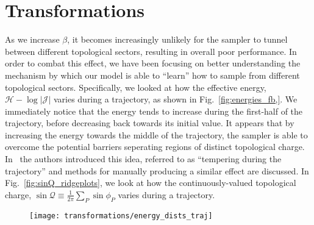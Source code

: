 %
\section{Transformations}
\label{sec:transformations}
%
As we increase \(\beta\), it becomes increasingly unlikely for the sampler to
tunnel between different topological sectors, resulting in overall poor
performance.
%
In order to combat this effect, we have been focusing on better understanding
the mechanism by which our model is able to ``learn'' how to sample from
different topological sectors.
%
Specifically, we looked at how the effective energy, \(\mathcal{H} -
\log|\mathcal{J}|\) varies during a trajectory, as shown in
Fig.~\ref{fig:energies_fb,}.
%
We immediately notice that the energy tends to increase during the first-half
of the trajectory, before decreasing back towards its initial value.
%
It appears that by increasing the energy towards the middle of the trajectory,
the sampler is able to overcome the potential barriers seperating regions of
distinct topological charge.
%
In~\cite{Neal_2012} the authors introduced this idea, referred to as
``tempering during the trajectory'' and methods for manually producing a
similar effect are discussed.
%
In Fig.~\ref{fig:sinQ_ridgeplots}, we look at how the continuously-valued
topological charge, \(\sin\mathcal{Q} \equiv
\frac{1}{2\pi}\sum_{P}\sin{\phi_{P}}\)
%
%
varies during a trajectory.
%
%
\begin{figure}[htpb]
  \centering
  \texttt{[image: transformations/energy\_dists\_traj]}
  \label{fig:energies_fb}
\end{figure}
%
